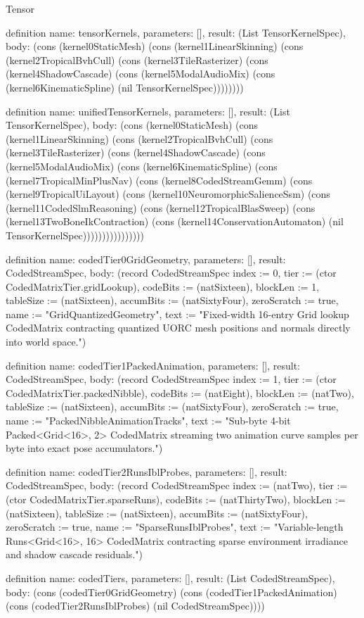\begin{lexlean}{Tensor}
\begin{semanticmodule}
definition{
  name: tensorKernels,
  parameters: [],
  result: (List TensorKernelSpec),
  body: (cons (kernel0StaticMesh) (cons (kernel1LinearSkinning) (cons (kernel2TropicalBvhCull) (cons (kernel3TileRasterizer) (cons (kernel4ShadowCascade) (cons (kernel5ModalAudioMix) (cons (kernel6KinematicSpline) (nil TensorKernelSpec))))))))
}

definition{
  name: unifiedTensorKernels,
  parameters: [],
  result: (List TensorKernelSpec),
  body: (cons (kernel0StaticMesh) (cons (kernel1LinearSkinning) (cons (kernel2TropicalBvhCull) (cons (kernel3TileRasterizer) (cons (kernel4ShadowCascade) (cons (kernel5ModalAudioMix) (cons (kernel6KinematicSpline) (cons (kernel7TropicalMinPlusNav) (cons (kernel8CodedStreamGemm) (cons (kernel9TropicalUiLayout) (cons (kernel10NeuromorphicSalienceSsm) (cons (kernel11CodedSlmReasoning) (cons (kernel12TropicalBlasSweep) (cons (kernel13TwoBoneIkContraction) (cons (kernel14ConservationAutomaton) (nil TensorKernelSpec))))))))))))))))
}

definition{
  name: codedTier0GridGeometry,
  parameters: [],
  result: CodedStreamSpec,
  body: (record CodedStreamSpec {index := 0, tier := (ctor CodedMatrixTier.gridLookup), codeBits := (natSixteen), blockLen := 1, tableSize := (natSixteen), accumBits := (natSixtyFour), zeroScratch := true, name := "GridQuantizedGeometry", text := "Fixed-width 16-entry Grid lookup CodedMatrix contracting quantized UORC mesh positions and normals directly into world space."})
}

definition{
  name: codedTier1PackedAnimation,
  parameters: [],
  result: CodedStreamSpec,
  body: (record CodedStreamSpec {index := 1, tier := (ctor CodedMatrixTier.packedNibble), codeBits := (natEight), blockLen := (natTwo), tableSize := (natSixteen), accumBits := (natSixtyFour), zeroScratch := true, name := "PackedNibbleAnimationTracks", text := "Sub-byte 4-bit Packed<Grid<16>, 2> CodedMatrix streaming two animation curve samples per byte into exact pose accumulators."})
}

definition{
  name: codedTier2RunsIblProbes,
  parameters: [],
  result: CodedStreamSpec,
  body: (record CodedStreamSpec {index := (natTwo), tier := (ctor CodedMatrixTier.sparseRuns), codeBits := (natThirtyTwo), blockLen := (natSixteen), tableSize := (natSixteen), accumBits := (natSixtyFour), zeroScratch := true, name := "SparseRunsIblProbes", text := "Variable-length Runs<Grid<16>, 16> CodedMatrix contracting sparse environment irradiance and shadow cascade residuals."})
}

definition{
  name: codedTiers,
  parameters: [],
  result: (List CodedStreamSpec),
  body: (cons (codedTier0GridGeometry) (cons (codedTier1PackedAnimation) (cons (codedTier2RunsIblProbes) (nil CodedStreamSpec))))
}


\end{semanticmodule}
\end{lexlean}
